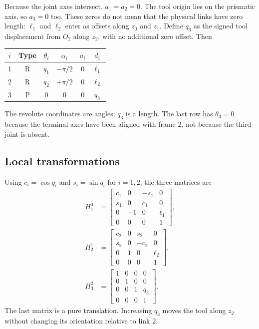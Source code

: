 Because the joint axes intersect, $a_1=a_2=0$. The tool origin lies on
the prismatic axis, so $a_3=0$ too. These zeros do not mean that the
physical links have zero length: $\ell_1$ and $\ell_2$ enter as offsets
along $z_0$ and $z_1$. Define $q_3$ as the signed tool displacement from
$O_2$ along $z_2$, with no additional zero offset. Then
\begin{center}
\begin{tabular}{cccccc}
\toprule
$i$ & Type & $\theta_i$ & $\alpha_i$ & $a_i$ & $d_i$\\
\midrule
1 & R & $q_1$ & $-\pi/2$ & $0$ & $\ell_1$\\
2 & R & $q_2$ & $+\pi/2$ & $0$ & $\ell_2$\\
3 & P & $0$ & $0$ & $0$ & $q_3$\\
\bottomrule
\end{tabular}
\end{center}
The revolute coordinates are angles; $q_3$ is a length. The last row has
$\theta_3=0$ because the terminal axes have been aligned with frame 2,
not because the third joint is absent.

\subsection{Local transformations}
Using $c_i=\cos q_i$ and $s_i=\sin q_i$ for $i=1,2$, the three matrices are
\begin{align}
 H_1^0&=\begin{bmatrix}
 c_1&0&-s_1&0\\s_1&0&c_1&0\\0&-1&0&\ell_1\\0&0&0&1
 \end{bmatrix},\\
 H_2^1&=\begin{bmatrix}
 c_2&0&s_2&0\\s_2&0&-c_2&0\\0&1&0&\ell_2\\0&0&0&1
 \end{bmatrix},\\
 H_3^2&=\begin{bmatrix}
 1&0&0&0\\0&1&0&0\\0&0&1&q_3\\0&0&0&1
 \end{bmatrix}.
\end{align}
The last matrix is a pure translation. Increasing $q_3$ moves the tool
along $z_2$ without changing its orientation relative to link 2.

